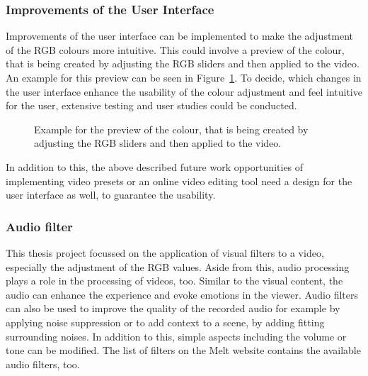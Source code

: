 \documentclass[../MasterThesis.tex]{subfiles}
\begin{document}
\subsubsection*{Improvements of the User Interface}


Improvements of the user interface can be implemented to make the adjustment of the RGB colours more intuitive. This could involve a preview of the colour, that is being created by adjusting the RGB sliders and then applied to the video. An example for this preview can be seen in Figure~\ref{figure:UI}.
To decide, which changes in the user interface enhance the usability of the colour adjustment and feel intuitive for the user, extensive testing and user studies could be conducted.

\begin{figure}[H]
	\begin{center}
		\caption[Example for the colour preview of the RGB sliders.]{Example for the preview of the colour, that is being created by adjusting the RGB sliders and then applied to the video.}
		\label{figure:UI}
	\end{center}
\end{figure}



In addition to this, the above described future work opportunities of implementing video presets or an online video editing tool need a design for the user interface as well, to guarantee the usability. 






\subsubsection*{Audio filter}

This thesis project focussed on the application of visual filters to a video, especially the adjustment of the RGB values. Aside from this, audio processing plays a role in the processing of videos, too. Similar to the visual content, the audio can enhance the experience and evoke emotions in the viewer. Audio filters can also be used to improve the quality of the recorded audio for example by applying noise suppression or to add context to a scene, by adding fitting surrounding noises. In addition to this, simple aspects including the volume or tone can be modified.
The list of filters on the Melt website contains the available audio filters, too.~\cite{melt}
\end{document}
